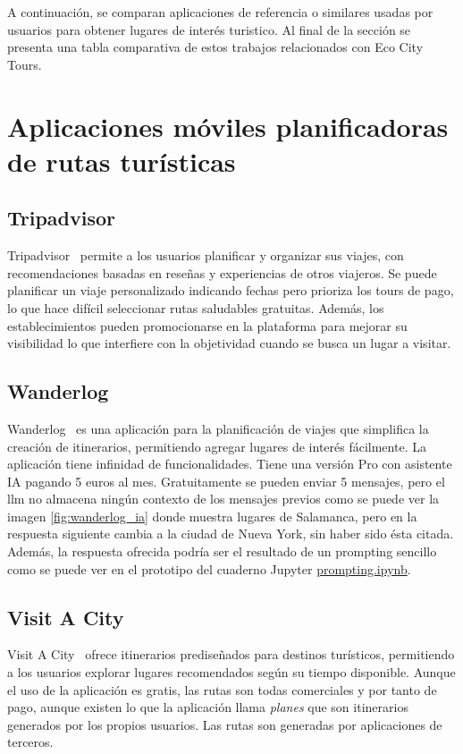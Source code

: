 
A continuación, se comparan aplicaciones de referencia o similares usadas por usuarios para obtener lugares de interés turistico. Al final de la sección se presenta una tabla comparativa de estos trabajos relacionados con Eco City Tours.
\section{Aplicaciones móviles planificadoras de rutas turísticas}
\subsection{Tripadvisor}
Tripadvisor~\cite{tripadvisor} permite a los usuarios planificar y organizar sus viajes, con recomendaciones basadas en reseñas y experiencias de otros viajeros. Se puede planificar un viaje personalizado indicando fechas pero prioriza los tours de pago, lo que hace difícil seleccionar rutas saludables gratuitas. Además, los establecimientos pueden promocionarse en la plataforma para mejorar su visibilidad lo que interfiere con la objetividad cuando se busca un lugar a visitar.

\subsection{Wanderlog}
Wanderlog~\cite{wanderlog} es una aplicación para la planificación de viajes que simplifica la creación de itinerarios, permitiendo agregar lugares de interés fácilmente. La aplicación tiene infinidad de funcionalidades. Tiene una versión Pro con asistente IA pagando 5 euros al mes. Gratuitamente se pueden enviar 5 mensajes, pero el \acrshort{llm} no almacena ningún contexto de los mensajes previos como se puede ver la imagen \ref{fig:wanderlog_ia} donde muestra lugares de  Salamanca, pero en la respuesta siguiente cambia a la ciudad de Nueva York, sin haber sido ésta citada. Además, la respuesta ofrecida podría ser el resultado de un prompting sencillo como se puede ver en el prototipo del cuaderno Jupyter \href{https://github.com/fps1001/TFGII_FPisot/tree/main/project-prototypes/prompting.ipynb}{prompting.ipynb}.

\subsection{Visit A City}
Visit A City~\cite{visitacity} ofrece itinerarios prediseñados para destinos turísticos, permitiendo a los usuarios explorar lugares recomendados según su tiempo disponible. Aunque el uso de la aplicación es gratis, las rutas son todas comerciales y por tanto de pago, aunque existen lo que la aplicación llama \textit{planes} que son itinerarios generados por los propios usuarios. Las rutas son generadas por aplicaciones de terceros.

